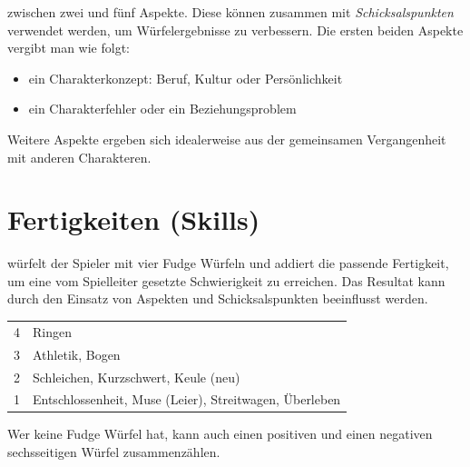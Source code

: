 \documentclass{tufte-handout}
\begin{document}
 zwischen zwei und fünf Aspekte.
 Diese können zusammen mit
\textit{Schicksalspunkten} verwendet werden, um Würfelergebnisse zu
verbessern. Die ersten beiden Aspekte vergibt man wie folgt:

\begin{itemize}\itemsep0pt
\item ein Charakterkonzept: Beruf, Kultur oder Persönlichkeit
\item ein Charakterfehler oder ein Beziehungsproblem
\end{itemize}

\noindent Weitere Aspekte ergeben sich idealerweise aus der
gemeinsamen Vergangenheit mit anderen Charakteren.


\section{Fertigkeiten (Skills)}

 würfelt der Spieler mit vier Fudge
Würfeln und addiert die
passende Fertigkeit, um eine vom Spielleiter gesetzte Schwierigkeit zu
erreichen. Das Resultat kann durch den Einsatz von Aspekten und
Schicksalspunkten beeinflusst werden.

\begin{margintable}
  \begin{tabular}{cp{1.8in}}
    4 & Ringen                                                    \\
    3 & Athletik, Bogen                                           \\
    2 & Schleichen, Kurzschwert, Keule (neu)                      \\
    1 & Entschlossenheit, Muse (Leier), Streitwagen, Überleben    \\
  \end{tabular}
\end{margintable}

Wer keine Fudge Würfel hat, kann auch einen positiven und einen
negativen sechsseitigen Würfel zusammenzählen.
\end{document}
